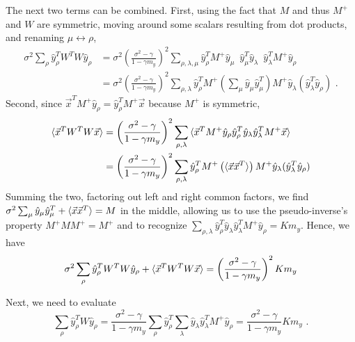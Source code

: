 \documentclass[letter, 12pt]{article}
\begin{document}
The next two terms can be combined. First, using the fact that $M$ and thus $M^+$ and $W$ are symmetric, moving around some scalars resulting from dot products, and renaming $\mu \leftrightarrow \rho$,
\begin{align*}
	\sigma^2 \sum_{\rho} \hat{y}_{\rho}^T W^T W \hat{y}_{\rho} 
	&= \sigma^2 \left(\frac{\sigma^2 - \gamma}{1 - \gamma m_y}\right)^2 \sum_{\rho, \lambda, \mu} \hat{y}_{\rho}^T M^+ \hat{y}_{\mu} \,\,\, \hat{y}_{\mu}^T \hat{y}_{\lambda}  \,\,\, \hat{y}_{\lambda}^T M^+ \hat{y}_{\rho}	\\
	&= \sigma^2 \left(\frac{\sigma^2 - \gamma}{1 - \gamma m_y}\right)^2 \sum_{\rho, \lambda} \hat{y}_{\rho}^T M^+ \left(\sum_{\mu} \hat{y}_{\mu} \hat{y}_{\mu}^T \right) M^+ \hat{y}_{\lambda} (\hat{y}_{\lambda}^T \hat{y}_{\rho}) \,\, .
\end{align*}
Second, since $\vec{x}^T M^+ \hat{y}_{\rho} = \hat{y}_{\rho}^T M^+ \vec{x}$ because $M^+$ is symmetric,
\begin{align*}
	\braket{\vec{x}^T W^T W \vec{x}} 
	&= \left(\frac{\sigma^2 - \gamma}{1 - \gamma m_y}\right)^2 \sum_{\rho, \lambda} \braket{\vec{x}^T M^+ \hat{y}_{\rho} \hat{y}_{\rho}^T \hat{y}_{\lambda} \hat{y}_{\lambda}^T M^+ \vec{x} }	\\
	&= \left(\frac{\sigma^2 - \gamma}{1 - \gamma m_y}\right)^2 \sum_{\rho, \lambda} \hat{y}_{\rho}^T M^+ \left( \braket{\vec{x} \vec{x}^T} \right) M^+ \hat{y}_{\lambda} (\hat{y}_{\lambda}^T \hat{y}_{\rho})
\end{align*}
Summing the two, factoring out left and right common factors, we find $\sigma^2 \sum_{\mu} \hat{y}_{\mu} \hat{y}_{\mu}^T + \braket{\vec{x}\vec{x}^T} = M$ in the middle, allowing us to use the pseudo-inverse's property $M^+ M M^+ = M^+$ and to recognize $\sum_{\rho, \lambda} \hat{y}_{\rho}^T \hat{y}_{\lambda} \hat{y}_{\lambda}^T M^+ \hat{y}_{\rho} = K m_y$. Hence, we have
\begin{equation*}
	\sigma^2 \sum_{\rho} \hat{y}_{\rho}^T W^T W \hat{y}_{\rho}  + \braket{\vec{x}^T W^T W \vec{x}}  =  \left(\frac{\sigma^2 - \gamma}{1 - \gamma m_y}\right)^2 K m_y
\end{equation*}

Next, we need to evaluate
\begin{equation*}
	\sum_{\rho} \hat{y}_{\rho}^T W \hat{y}_{\rho} = \frac{\sigma^2 - \gamma}{1 - \gamma m_y} \sum_{\rho} \hat{y}_{\rho}^T \sum_{\lambda} \hat{y}_{\lambda} \hat{y}_{\lambda}^T M^+ \hat{y}_{\rho} =  \frac{\sigma^2 - \gamma}{1 - \gamma m_y} K m_y \,\, .
\end{equation*}
\end{document}
